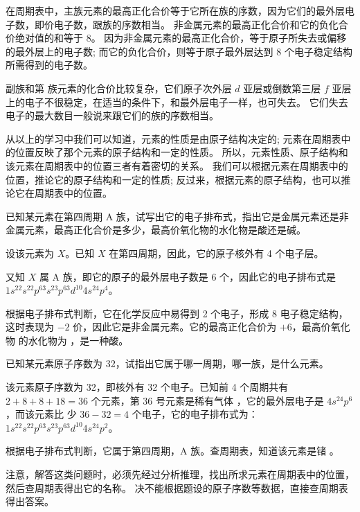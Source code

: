 在周期表中，主族元素的最高正化合价等于它所在族的序数，因为它们的最外层电子数，即价电子数，跟族的序数相当。
非金属元素的最高正化合价和它的负化合价绝对值的和等于 8。
因为非金属元素的最高正化合价，等于原子所失去或偏移的最外层上的电子数; 而它的负化合价，则等于原子最外层达到 8 个电子稳定结构所需得到的电子数。

副族和第  族元素的化合价比较复杂，它们原子次外层 $d$ 亚层或倒数第三层 $f$ 亚层上的电子不很稳定，在适当的条件下，和最外层电子一样，也可失去。
它们失去电子的最大数目一般说来跟它们的族的序数相当。

从以上的学习中我们可以知道，元素的性质是由原子结构决定的; 元素在周期表中的位置反映了那个元素的原子结构和一定的性质。
所以，元素性质、原子结构和该元素在周期表中的位置三者有着密切的关系。
我们可以根据元素在周期表中的位置，推论它的原子结构和一定的性质; 反过来，根据元素的原子结构，也可以推论它在周期表中的位置。

\begin{example}
  已知某元素在第四周期 A 族，试写出它的电子排布式，指出它是金属元素还是非金属元素，最高正化合价是多少，最高价氧化物的水化物是酸还是碱。
\end{example}
\begin{solution}
设该元素为 $X$。已知 $X$ 在第四周期，因此，它的原子核外有 4 个电子层。

又知 $X$ 属 A 族，即它的原子的最外层电子数是 6 个，因此它的电子排布式是 $1s^22s^22p^63s^23p^63d^{10}4s^24p^4$。

根据电子排布式判断，它在化学反应中易得到 2 个电子，形成 8 电子稳定结构，这时表现为 $-2$ 价，因此它是非金属元素。它的最高正化合价为 $+6$，最高价氧化物  的水化物为 ，是一种酸。
\end{solution}

\begin{example}
已知某元素原子序数为 32，试指出它属于哪一周期，哪一族，是什么元素。
\end{example}
\begin{solution}
  该元素原子序数为 32，即核外有 32 个电子。已知前 4 个周期共有 $2+8+8+18=36$ 个元素，第 36 号元素是稀有气体 ，它的最外层电子是 $4s^24p^6$，而该元素比   少 $36-32=4$ 个电子，它的电子排布式为：$1s^22s^22p^63s^23p^63d^{10}4s^24p^2$。
  
根据电子排布式判断，它属于第四周期，A 族。查周期表，知道该元素是锗 。
\end{solution}

注意，解答这类问题时，必须先经过分析推理，找出所求元素在周期表中的位置，然后查周期表得出它的名称。
决不能根据题设的原子序数等数据，直接查周期表得出答案。


